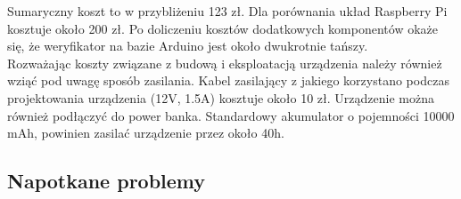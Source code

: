 \documentclass[declaration,shortabstract, mgr]{iithesis}
\begin{document}
\indent Sumaryczny koszt to w przybliżeniu 123 zł. Dla porównania układ Raspberry Pi kosztuje około 200 zł. Po doliczeniu kosztów dodatkowych komponentów okaże się, że weryfikator na bazie Arduino jest około dwukrotnie tańszy.\\
\indent Rozważając koszty związane z budową i eksploatacją urządzenia należy również wziąć pod uwagę sposób zasilania. Kabel zasilający z jakiego korzystano podczas projektowania urządzenia (12V, 1.5A) kosztuje około 10 zł. Urządzenie można również podłączyć do power banka. Standardowy akumulator o pojemności 10000 mAh, powinien zasilać urządzenie przez około 40h.

\subsection{Napotkane problemy}
\end{document}
